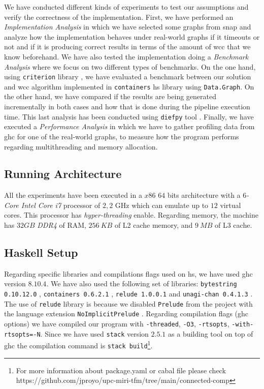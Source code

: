 \documentclass[preprint]{elsarticle}
\begin{document}
We have conducted different kinds of experiments to test our assumptions and verify the correctness of the implementation.
First, we have performed an \emph{Implementation Analysis} in which we have selected some graphs from \acrfull{snap} \cite{stanford} and analyze how the implementation behaves under real-world graphs if it timeouts or not and if it is producing correct results in terms of the amount of \acrshort{wcc} that we know beforehand.
We have also tested the implementation doing a \emph{Benchmark Analysis} where we focus on two different types of benchmarks. On the one hand, using \texttt{criterion} library \cite{criterion}, we have evaluated a benchmark between our solution and \acrshort{wcc} algorithm implemented in \texttt{containers} \acrshort{hs} library \cite{containers} using \texttt{Data.Graph}. On the other hand, we have compared if the results are being generated incrementally in both cases and how that is done during the pipeline execution time. This last analysis has been conducted using \texttt{diefpy} tool \cite{diefpaper,diefpy}.
Finally, we have executed a \textit{Performance Analysis} in which we have to gather profiling data from \acrfull{ghc} for one of the real-world graphs, to measure how the program performs regarding multithreading and memory allocation.

\subsection{Running Architecture}
All the experiments have been executed in a $x86$ $64$ bits architecture with a \textit{$6$-Core Intel Core i7} processor of $2,2$ GHz which can emulate up to $12$ virtual cores. This processor has \emph{hyper-threading} enable. Regarding memory, the machine has $32 GB$ \emph{DDR4} of RAM, $256\ KB$ of L2 cache memory, and $9\ MB$ of L3 cache.

\subsection{Haskell Setup}
Regarding specific libraries and compilations flags used on \acrshort{hs}, we have used \acrshort{ghc} version $8.10.4$. We have also used the following set of libraries: \texttt{bytestring 0.10.12.0} \cite{bytestring}, \texttt{containers 0.6.2.1} \cite{containers}, \texttt{relude 1.0.0.1} \cite{relude} and \texttt{unagi-chan 0.4.1.3} \cite{unagi}. The use of \texttt{relude} library is because we disabled \texttt{Prelude} from the project with the language extension \texttt{NoImplicitPrelude} \cite{extensions}. Regarding compilation flags (\acrshort{ghc} options) we have compiled our program with \texttt{-threaded}, \texttt{-O3}, \texttt{-rtsopts}, \texttt{-with-rtsopts=-N}. Since we have used \texttt{stack} version $2.5.1$ \cite{stack} as a building tool on top of \acrshort{ghc} the compilation command is \texttt{stack build}\footnote{For more information about package.yaml or cabal file please check https://github.com/jproyo/upc-miri-tfm/tree/main/connected-comp}.
\end{document}
